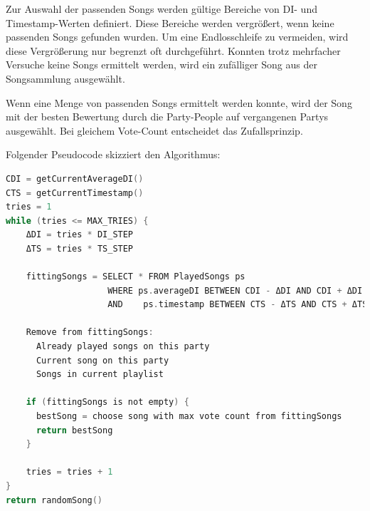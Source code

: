 Zur Auswahl der passenden Songs werden gültige Bereiche von DI- und Timestamp-Werten definiert.
Diese Bereiche werden vergrößert, wenn keine passenden Songs gefunden wurden. Um eine Endlosschleife
zu vermeiden, wird diese Vergrößerung nur begrenzt oft durchgeführt. Konnten trotz mehrfacher 
Versuche keine Songs ermittelt werden, wird ein zufälliger Song aus der Songsammlung ausgewählt.

Wenn eine Menge von passenden Songs ermittelt werden konnte, wird der Song mit der besten
Bewertung durch die Party-People auf vergangenen Partys ausgewählt. Bei gleichem Vote-Count
entscheidet das Zufallsprinzip. 

Folgender Pseudocode skizziert den Algorithmus:
\begin{lstlisting}[language=C]
CDI = getCurrentAverageDI()
CTS = getCurrentTimestamp()
tries = 1
while (tries <= MAX_TRIES) {
	ΔDI = tries * DI_STEP
	ΔTS = tries * TS_STEP
	
	fittingSongs = SELECT * FROM PlayedSongs ps
                    WHERE ps.averageDI BETWEEN CDI - ΔDI AND CDI + ΔDI
                    AND    ps.timestamp BETWEEN CTS - ΔTS AND CTS + ΔTS
				   	 
	Remove from fittingSongs: 
	  Already played songs on this party
	  Current song on this party
	  Songs in current playlist
		
	if (fittingSongs is not empty) {
	  bestSong = choose song with max vote count from fittingSongs
	  return bestSong
	}
	
	tries = tries + 1
}
return randomSong()
\end{lstlisting}
